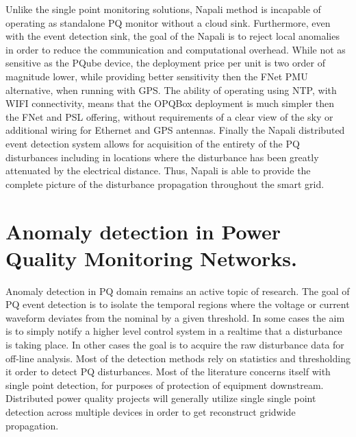 Unlike the single point monitoring solutions, Napali method is incapable of operating as standalone PQ monitor without a cloud sink. Furthermore, even with the event detection sink, the goal of the Napali is to reject local anomalies in order to reduce the communication and computational overhead. While not as sensitive as the PQube device, the deployment price per unit is two order of magnitude lower, while providing better sensitivity then the FNet PMU alternative, when running with GPS. The ability of operating using NTP, with WIFI connectivity, means that the OPQBox deployment is much simpler then the FNet and PSL offering, without requirements of a clear view of the sky or additional wiring for Ethernet and GPS antennas. Finally the Napali distributed event detection system allows for acquisition of the entirety of the PQ disturbances including in locations where the disturbance has been greatly attenuated by the electrical distance. Thus, Napali is able to provide the complete picture of the disturbance propagation throughout the smart grid.

\section{Anomaly detection in Power Quality Monitoring Networks.}

Anomaly detection in PQ domain remains an active topic of research. The goal of PQ event detection is to isolate the temporal regions where the voltage or current waveform deviates from the nominal by a given threshold. In some cases the aim is to simply notify a higher level control system in a realtime that a disturbance is taking place. In other cases the goal is to acquire the raw disturbance data for off-line analysis. Most of the detection methods rely on statistics and thresholding it order to detect PQ disturbances. Most of the literature concerns itself with single point detection, for purposes of protection of equipment downstream.\cite{gu2004statistical}\cite{karimi2000wavelet} \cite{shin2006power} Distributed power quality projects will generally utilize single single point detection across multiple devices in order to get reconstruct gridwide propagation.\cite{von2014micro}

